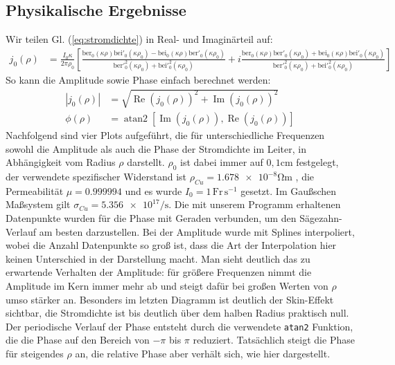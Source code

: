\documentclass[10pt,a4paper]{article}
\begin{document}
\subsection{Physikalische Ergebnisse}
\label{ssec:physikalischeergebnisse}
Wir teilen Gl. (\ref{eq:stromdichte}) in Real- und Imaginärteil auf:
\begin{align}
	j_0(\rho) &= \frac{I_0 \kappa}{2 \pi \rho_0} \left[ \frac{\mathrm{ber}_0(\kappa \rho)\mathrm{bei}'_0(\kappa \rho_0) - \mathrm{bei}_0(\kappa \rho)\mathrm{ber}'_0(\kappa \rho_0)}{\mathrm{ber}'^2_0(\kappa \rho_0)+\mathrm{bei}'^2_0(\kappa \rho_0)} + i\frac{\mathrm{ber}_0(\kappa \rho)\mathrm{ber}'_0(\kappa \rho_0) + \mathrm{bei}_0(\kappa \rho)\mathrm{bei}'_0(\kappa \rho_0)}{\mathrm{ber}'^2_0(\kappa \rho_0)+\mathrm{bei}'^2_0(\kappa \rho_0)}\right]
\end{align}
So kann die Amplitude sowie Phase einfach berechnet werden:
\begin{align}
	|j_0(\rho)| &= \sqrt{\operatorname{Re}(j_0(\rho))^2 + \operatorname{Im}(j_0(\rho))^2}\\
	\phi(\rho) &= \operatorname{atan2}\left[\operatorname{Im}(j_0(\rho)), \operatorname{Re}(j_0(\rho))\right]
\end{align}
Nachfolgend sind vier Plots aufgeführt, die für unterschiedliche Frequenzen sowohl die Amplitude als auch die Phase der Stromdichte im Leiter, in Abhängigkeit vom Radius $\rho$ darstellt. $\rho_0$ ist dabei immer auf $0,1\mathrm{cm}$ festgelegt, der verwendete spezifischer Widerstand ist $\rho_{Cu} = \num{1.678e-8} \si{\ohm\metre}$ \cite{crchandbook}, die Permeabilität $\mu = \num{0.999994}$ \cite{crchandbook} und es wurde $I_0 = \num{1} \, \mathrm{Fr}\,\mathrm{s}^{-1}$ gesetzt. Im Gaußschen Maßsystem gilt $\sigma_{Cu} = \num{5.356e17} \si{\per\second}$. Die mit unserem Programm erhaltenen Datenpunkte wurden für die Phase mit Geraden verbunden, um den Sägezahn-Verlauf am besten darzustellen. Bei der Amplitude wurde mit Splines interpoliert, wobei die Anzahl Datenpunkte so groß ist, dass die Art der Interpolation hier keinen Unterschied in der Darstellung macht. Man sieht deutlich das zu erwartende Verhalten der Amplitude: für größere Frequenzen nimmt die Amplitude im Kern immer mehr ab und steigt dafür bei großen Werten von $\rho$ umso stärker an. Besonders im letzten Diagramm ist deutlich der Skin-Effekt sichtbar, die Stromdichte ist bis deutlich über dem halben Radius praktisch null. Der periodische Verlauf der Phase entsteht durch die verwendete \texttt{atan2} Funktion, die die Phase auf den Bereich von $-\pi$ bis $\pi$ reduziert. Tatsächlich steigt die Phase für steigendes $\rho$ an, die relative Phase aber verhält sich, wie hier dargestellt.
\end{document}
